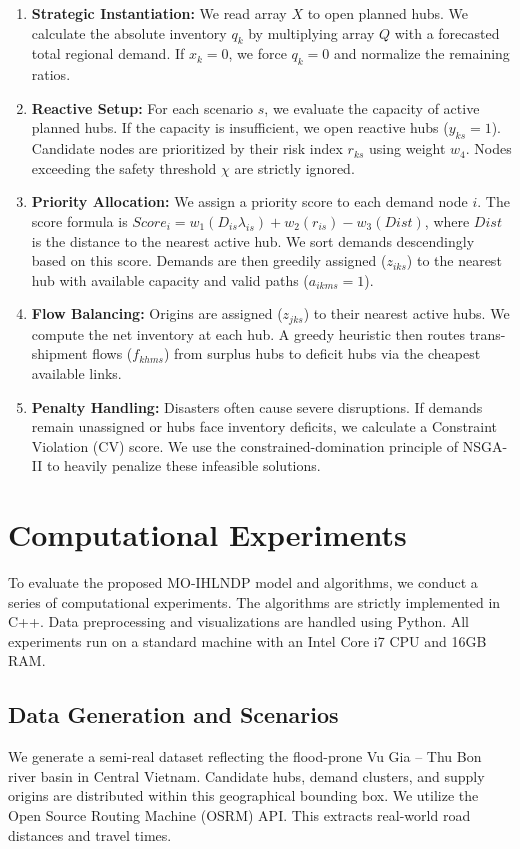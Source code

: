 \documentclass{llncs}
\begin{document}
{\begin{enumerate}
    \item \textbf{Strategic Instantiation:} We read array $X$ to open planned hubs. We calculate the absolute inventory $q_k$ by multiplying array $Q$ with a forecasted total regional demand. If $x_k = 0$, we force $q_k = 0$ and normalize the remaining ratios.
    \item \textbf{Reactive Setup:} For each scenario $s$, we evaluate the capacity of active planned hubs. If the capacity is insufficient, we open reactive hubs ($y_{ks} = 1$). Candidate nodes are prioritized by their risk index $r_{ks}$ using weight $w_4$. Nodes exceeding the safety threshold $\chi$ are strictly ignored.
    \item \textbf{Priority Allocation:} We assign a priority score to each demand node $i$. The score formula is $Score_i = w_1(D_{is}\lambda_{is}) + w_2(r_{is}) - w_3(Dist)$, where $Dist$ is the distance to the nearest active hub. We sort demands descendingly based on this score. Demands are then greedily assigned ($z_{iks}$) to the nearest hub with available capacity and valid paths ($a_{ikms}=1$).
    \item \textbf{Flow Balancing:} Origins are assigned ($z_{jks}$) to their nearest active hubs. We compute the net inventory at each hub. A greedy heuristic then routes trans-shipment flows ($f_{khms}$) from surplus hubs to deficit hubs via the cheapest available links.
    \item \textbf{Penalty Handling:} Disasters often cause severe disruptions. If demands remain unassigned or hubs face inventory deficits, we calculate a Constraint Violation (CV) score. We use the constrained-domination principle of NSGA-II to heavily penalize these infeasible solutions.
\end{enumerate}



\section{Computational Experiments}
To evaluate the proposed MO-IHLNDP model and algorithms, we conduct a series of computational experiments. The algorithms are strictly implemented in C++. Data preprocessing and visualizations are handled using Python. All experiments run on a standard machine with an Intel Core i7 CPU and 16GB RAM.

\subsection{Data Generation and Scenarios}
We generate a semi-real dataset reflecting the flood-prone Vu Gia -- Thu Bon river basin in Central Vietnam. Candidate hubs, demand clusters, and supply origins are distributed within this geographical bounding box. We utilize the Open Source Routing Machine (OSRM) API. This extracts real-world road distances and travel times. 

}
\end{document}
